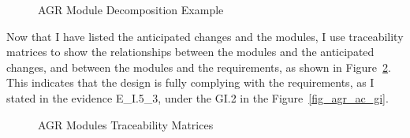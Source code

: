 \begin{figure}[H]
    \centering
    \caption[AGR Module Decomposition Example]{AGR Module Decomposition Example}
    \label{fig_agr_md}
\end{figure}

Now that I have listed the anticipated changes and the modules, I use traceability matrices to show the relationships between the modules and the anticipated changes, and between the modules and the requirements, as shown in Figure~\ref{fig_agr_mtm}. This indicates that the design is fully complying with the requirements, as I stated in the evidence E\_I.5\_3, under the GI.2 in the Figure~\ref{fig_agr_ac_gi}.

\begin{figure}[H]
    \centering
    \caption[AGR Modules Traceability Matrices]{AGR Modules Traceability Matrices}
    \label{fig_agr_mtm}
\end{figure}

